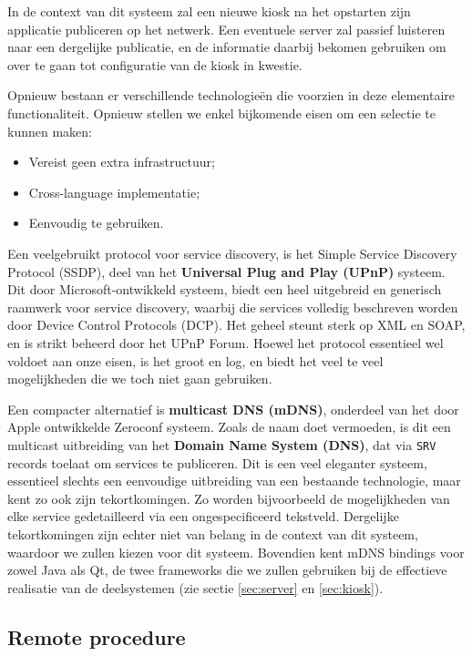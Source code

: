In de context van dit systeem zal een nieuwe kiosk na het opstarten zijn applicatie publiceren op het netwerk. Een eventuele server zal passief luisteren naar een dergelijke publicatie, en de informatie daarbij bekomen gebruiken om over te gaan tot configuratie van de kiosk in kwestie.

Opnieuw bestaan er verschillende technologieën die voorzien in deze elementaire functionaliteit. Opnieuw stellen we enkel bijkomende eisen om een selectie te kunnen maken:
\begin{itemize}
\item Vereist geen extra infrastructuur;
\item Cross-language implementatie;
\item Eenvoudig te gebruiken.
\end{itemize}

Een veelgebruikt protocol voor service discovery, is het Simple Service Discovery Protocol (SSDP), deel van het \textbf{Universal Plug and Play (UPnP)} systeem. Dit door Microsoft-ontwikkeld systeem, biedt een heel uitgebreid en generisch raamwerk voor service discovery, waarbij die services volledig beschreven worden door Device Control Protocols (DCP). Het geheel steunt sterk op XML en SOAP, en is strikt beheerd door het UPnP Forum. Hoewel het protocol essentieel wel voldoet aan onze eisen, is het groot en log, en biedt het veel te veel mogelijkheden die we toch niet gaan gebruiken.

Een compacter alternatief is \textbf{multicast DNS (mDNS)}, onderdeel van het door Apple ontwikkelde Zeroconf systeem. Zoals de naam doet vermoeden, is dit een multicast uitbreiding van het \textbf{Domain Name System (DNS)}, dat via \texttt{SRV} records toelaat om services te publiceren. Dit is een veel eleganter systeem, essentieel slechts een eenvoudige uitbreiding van een bestaande technologie, maar kent zo ook zijn tekortkomingen. Zo worden bijvoorbeeld de mogelijkheden van elke service gedetailleerd via een ongespecificeerd tekstveld. Dergelijke tekortkomingen zijn echter niet van belang in de context van dit systeem, waardoor we zullen kiezen voor dit systeem. Bovendien kent mDNS bindings voor zowel Java als Qt, de twee frameworks die we zullen gebruiken bij de effectieve realisatie van de deelsystemen (zie sectie \ref{sec:server} en \ref{sec:kiosk}).

\subsection{Remote procedure}

